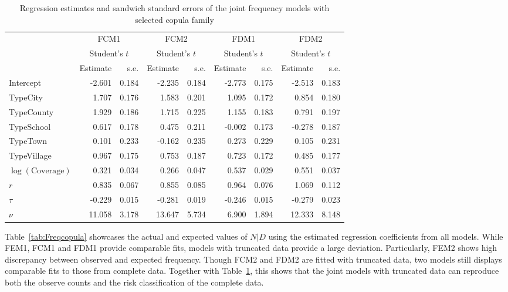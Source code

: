 \documentclass[11pt]{article}
\newcommand{\rev}[1]{{\color{blue}#1}}
\begin{document}
{\begin{table}[!h]
\centering
\begin{tabular}[t]{lrrrrrrrr}
\toprule
\multicolumn{1}{c}{ } & \multicolumn{2}{c}{FCM1} & \multicolumn{2}{c}{FCM2} & \multicolumn{2}{c}{FDM1} & \multicolumn{2}{c}{FDM2} \\
\cmidrule(l{3pt}r{3pt}){2-3} \cmidrule(l{3pt}r{3pt}){4-5} \cmidrule(l{3pt}r{3pt}){6-7} \cmidrule(l{3pt}r{3pt}){8-9}
\multicolumn{1}{c}{ } & \multicolumn{2}{c}{Student's $t$} & \multicolumn{2}{c}{Student's $t$} & \multicolumn{2}{c}{Student's $t$} & \multicolumn{2}{c}{Student's $t$} \\
  & Estimate & s.e. & Estimate & s.e. & Estimate & s.e. & Estimate & s.e.\\
\midrule
Intercept & -2.601 & 0.184 & -2.235 & 0.184 & -2.773 & 0.175 & -2.513 & 0.183 \\
TypeCity & 1.707 & 0.176 & 1.583 & 0.201 & 1.095 & 0.172 & 0.854 & 0.180 \\
TypeCounty & 1.929 & 0.186 & 1.715 & 0.225 & 1.155 & 0.183 & 0.791 & 0.197 \\
TypeSchool & 0.617 & 0.178 & 0.475 & 0.211 & -0.002 & 0.173 & -0.278 & 0.187 \\
TypeTown & 0.101 & 0.233 & -0.162 & 0.235 & 0.273 & 0.229 & 0.105 & 0.231 \\
TypeVillage & 0.967 & 0.175 & 0.753 & 0.187 & 0.723 & 0.172 & 0.485 & 0.177 \\
$\log(\mathrm{Coverage})$ & 0.321 & 0.034 & 0.266 & 0.047 & 0.537 & 0.029 & 0.551 & 0.037 \\
$r$ & 0.835 & 0.067 & 0.855 & 0.085 & 0.964 & 0.076 & 1.069 & 0.112 \\
$\tau$ & -0.229 & 0.015 & -0.281 & 0.019 & -0.246 & 0.015 & -0.279 & 0.023 \\
$\nu$ & 11.058 & 3.178 & 13.647 & 5.734 & 6.900 & 1.894 & 12.333 & 8.148 \\
\bottomrule
\end{tabular}
\caption{Regression estimates {and sandwich standard errors} of the joint frequency models with selected copula family}
\label{tab:freqcopularesult}
\end{table}

Table~\ref{tab:Freqcopula} showcases the actual and expected values of $N|D$ using the estimated regression coefficients from all models. \rev{While FEM1, FCM1 and FDM1 provide comparable fits, models with truncated data provide a large deviation. Particularly, FEM2 shows high discrepancy between observed and expected frequency. Though FCM2 and FDM2 are fitted with truncated data, two models still displays comparable fits to those from complete data. Together with Table~\ref{tab:freqcopularesult}, this shows that the joint models with truncated data can reproduce both the observe counts and the risk classification of the complete data.} 

}
\end{document}
